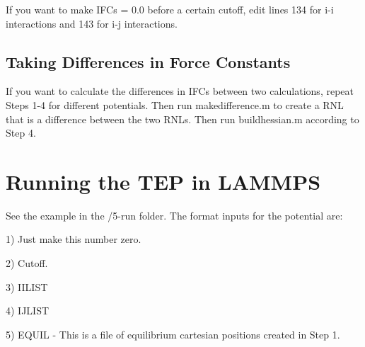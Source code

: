 \documentclass[20pt]{article}
\begin{document}
If you want to make IFCs = 0.0 before a certain cutoff, edit lines 134 for i-i interactions and 143 for i-j interactions.

\subsection{Taking Differences in Force Constants}
If you want to calculate the differences in IFCs between two calculations, repeat Steps 1-4 for different potentials. Then run makedifference.m to create a RNL that is a difference between the two RNLs. Then run buildhessian.m according to Step 4.



\section{Running the TEP in LAMMPS}
See the example in the /5-run folder. The format inputs for the potential are:

1) Just make this number zero.

2) Cutoff.

3) IILIST

4) IJLIST

5) EQUIL - This is a file of equilibrium cartesian positions created in Step 1.
\end{document}
